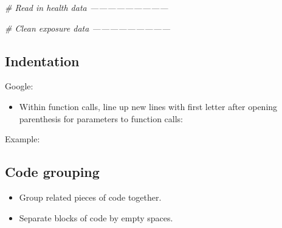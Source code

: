 \documentclass[]{book}
\makeatletter
\newenvironment{Shaded}{\begin{snugshade}}{\end{snugshade}}
\newcommand{\KeywordTok}[1]{\textcolor[rgb]{0.13,0.29,0.53}{\textbf{{#1}}}}
\newcommand{\DataTypeTok}[1]{\textcolor[rgb]{0.13,0.29,0.53}{{#1}}}
\newcommand{\DecValTok}[1]{\textcolor[rgb]{0.00,0.00,0.81}{{#1}}}
\newcommand{\StringTok}[1]{\textcolor[rgb]{0.31,0.60,0.02}{{#1}}}
\newcommand{\CommentTok}[1]{\textcolor[rgb]{0.56,0.35,0.01}{\textit{{#1}}}}
\newcommand{\NormalTok}[1]{{#1}}
\providecommand{\tightlist}{%
  \setlength{\itemsep}{0pt}\setlength{\parskip}{0pt}}
\newenvironment{kframe}{%
\medskip{}
\setlength{\fboxsep}{.8em}
 \def\at@end@of@kframe{}%
 \ifinner\ifhmode%
  \def\at@end@of@kframe{\end{minipage}}%
  \begin{minipage}{\columnwidth}%
 \fi\fi%
 \def\FrameCommand##1{\hskip\@totalleftmargin \hskip-\fboxsep
 \colorbox{shadecolor}{##1}\hskip-\fboxsep
     \hskip-\linewidth \hskip-\@totalleftmargin \hskip\columnwidth}%
 \MakeFramed {\advance\hsize-\width
   \@totalleftmargin\z@ \linewidth\hsize
   \@setminipage}}%
 {\par\unskip\endMakeFramed%
 \at@end@of@kframe}
\renewenvironment{Shaded}{\begin{kframe}}{\end{kframe}}
\makeatother
\begin{document}
\begin{Shaded}
\begin{Highlighting}[]
\CommentTok{# Read in health data ---------------------------}

\CommentTok{# Clean exposure data ---------------------------}
\end{Highlighting}
\end{Shaded}

\subsection{Indentation}\label{indentation}

Google:

\begin{itemize}
\tightlist
\item
  Within function calls, line up new lines with first letter after
  opening parenthesis for parameters to function calls:
\end{itemize}

Example:

\begin{Shaded}
\end{Shaded}

\subsection{Code grouping}\label{code-grouping}

\begin{itemize}
\tightlist
\item
  Group related pieces of code together.
\item
  Separate blocks of code by empty spaces.
\end{itemize}

\begin{Shaded}
\end{Shaded}
\end{document}

